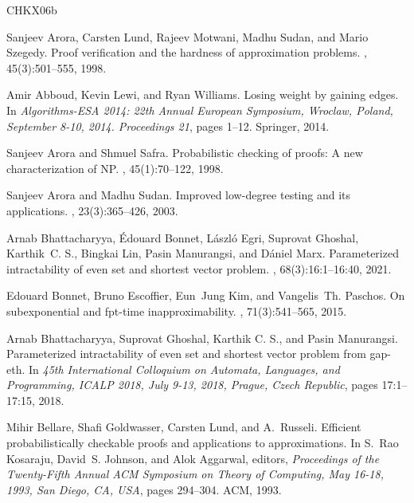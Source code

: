 \documentclass[10pt,a4paper]{article}
\begin{document}
\newcommand{\etalchar}[1]{$^{#1}$}
\begin{thebibliography}{CHKX06b}

\bibitem[ALM{\etalchar{+}}98]{ALMSS98}
Sanjeev Arora, Carsten Lund, Rajeev Motwani, Madhu Sudan, and Mario Szegedy.
\newblock Proof verification and the hardness of approximation problems.
, 45(3):501--555, 1998.

Amir Abboud, Kevin Lewi, and Ryan Williams.
\newblock Losing weight by gaining edges.
\newblock In {\em Algorithms-ESA 2014: 22th Annual European Symposium, Wroclaw,
  Poland, September 8-10, 2014. Proceedings 21}, pages 1--12. Springer, 2014.

Sanjeev Arora and Shmuel Safra.
\newblock Probabilistic checking of proofs: {A} new characterization of {NP}.
, 45(1):70--122, 1998.

Sanjeev Arora and Madhu Sudan.
\newblock Improved low-degree testing and its applications.
, 23(3):365--426, 2003.

\bibitem[BBE{\etalchar{+}}21]{BBEGKLMM21}
Arnab Bhattacharyya, {\'{E}}douard Bonnet, L{\'{a}}szl{\'{o}} Egri, Suprovat
  Ghoshal, Karthik~C. S., Bingkai Lin, Pasin Manurangsi, and D{\'{a}}niel Marx.
\newblock Parameterized intractability of even set and shortest vector problem.
, 68(3):16:1--16:40, 2021.

Edouard Bonnet, Bruno Escoffier, Eun~Jung Kim, and Vangelis~Th. Paschos.
\newblock On subexponential and fpt-time inapproximability.
, 71(3):541--565, 2015.

Arnab Bhattacharyya, Suprovat Ghoshal, {Karthik {C. S.}}, and Pasin Manurangsi.
\newblock Parameterized intractability of even set and shortest vector problem
  from gap-eth.
\newblock In {\em 45th International Colloquium on Automata, Languages, and
  Programming, {ICALP} 2018, July 9-13, 2018, Prague, Czech Republic}, pages
  17:1--17:15, 2018.

Mihir Bellare, Shafi Goldwasser, Carsten Lund, and A.~Russeli.
\newblock Efficient probabilistically checkable proofs and applications to
  approximations.
\newblock In S.~Rao Kosaraju, David~S. Johnson, and Alok Aggarwal, editors,
  {\em Proceedings of the Twenty-Fifth Annual {ACM} Symposium on Theory of
  Computing, May 16-18, 1993, San Diego, CA, {USA}}, pages 294--304. {ACM},
  1993.


\end{thebibliography}
\end{document}
